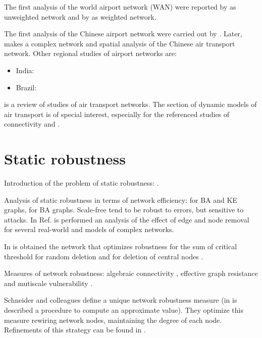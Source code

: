 \documentclass[12pt]{article}
\begin{document}
The first analysis of the world airport network (WAN) were reported by \cite{Guimera2005, Guimera2004} as unweighted network and by \cite{Barrat2004} as weighted network.\medskip

The first analysis of the Chinese airport network were carried out by \cite{Li2004b}. Later, \cite{Lin2012a} makes a complex network and spatial analysis of the Chinese air transport network. Other regional studies of airport networks are:

\begin{itemize}
	\item India: \cite{Bagler2008}
	\item Brazil: \cite{DaRocha2009}
\end{itemize}

\cite{Zanin2013} is a review of studies of air transport networks. The section of dynamic models of air transport is of special interest, especially for the referenced studies of connectivity \cite{Burghouwt2005} and \cite{Malighetti2008}. 

\section{Static robustness}

Introduction of the problem of static robustness: \cite{Albert2000}. \medskip

Analysis of static robustness in terms of network efficiency: \cite{Crucitti2003}  for BA and KE graphs, \cite{Crucitti2004b} for BA graphs. Scale-free tend to be robust to errors, but sensitive to attacks. In Ref. \cite{Holme2002a} is performed an analysis of the effect of edge and node removal for several real-world and models of complex networks. \medskip

In \cite{Paul2005} is obtained the network that optimizes robustness for the sum of critical threshold for random deletion \cite{Cohen2000a} and for deletion of central nodes \cite{Cohen2001a}. \medskip

Measures of network robustness: algebraic connectivity \cite{Fiedler1973}, effective graph resistance \cite{Ellens2011} and mutiscale vulnerability \cite{Boccaletti2007}.\medskip

Schneider and colleagues \cite{Schneider2011} define a unique network robustness measure (in \cite{Hong2017} is described a procedure to compute an approximate value). They optimize this measure rewiring network nodes, maintaining the degree of each node. Refinements of this strategy can be found in \cite{Louzada2013, Yang2015, Zhou2014}.
\end{document}
